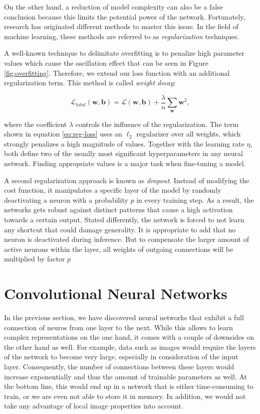 On the other hand, a reduction of model complexity can also be a false conclusion because this limits the potential power of the network. Fortunately, research has originated different methods to master this issue. In the field of machine learning, these methods are referred to as \textit{regularization} techniques.

A well-known technique to delimitate overfitting is to penalize high parameter values which cause the oscillation effect that can be seen in Figure \ref{fig:overfitting}. Therefore, we extend our loss function with an additional regularization term. This method is called \textit{weight decay}:

\begin{equation} \label{eq:reg-loss}
  \mathcal{L}_{total}(\textbf{w}, \textbf{b})= \mathcal{L}(\textbf{w}, \textbf{b}) + \frac{\lambda}{n} \sum\limits_{\textbf{w}}\textbf{w}^2 ,
\end{equation}

where the coefficient $ \lambda $ controls the influence of the regularization. The term shown in equation \ref{eq:reg-loss} uses an $ \ell_{2} $ regularizer over all weights, which strongly penalizes a high magnitude of values. Together with the learning rate $ \eta $, both define two of the usually most significant hyperparameters in any neural network. Finding appropriate values is a major task when fine-tuning a model.

A second regularization approach is known as \textit{dropout}. Instead of modifying the cost function, it manipulates a specific layer of the model by randomly deactivating a neuron with a probability $p$ in every training step. As a result, the networks gets robust against distinct patterns that cause a high activation towards a certain output. Stated differently, the network is forced to not learn any shortcut that could damage generality. It is appropriate to add that no neuron is deactivated during inference. But to compensate the larger amount of active neurons within the layer, all weights of outgoing connections will be multiplied by factor $ p $ \parencite[p. 1931]{dropout}



\section{Convolutional Neural Networks}

In the previous section, we have discovered neural networks that exhibit a full connection of neuros from one layer to the next. While this allows to learn complex representations on the one hand, it comes with a couple of downsides on the other hand as well. For example, data such as images would require the layers of the network to become very large, especially in consideration of the input layer. Consequently, the number of connections between these layers would increase exponentially and thus the amount of trainable parameters as well. At the bottom line, this would end up in a network that is either time-consuming to train, or we are even not able to store it in memory. In addition, we would not take any advantage of local image properties into account.

